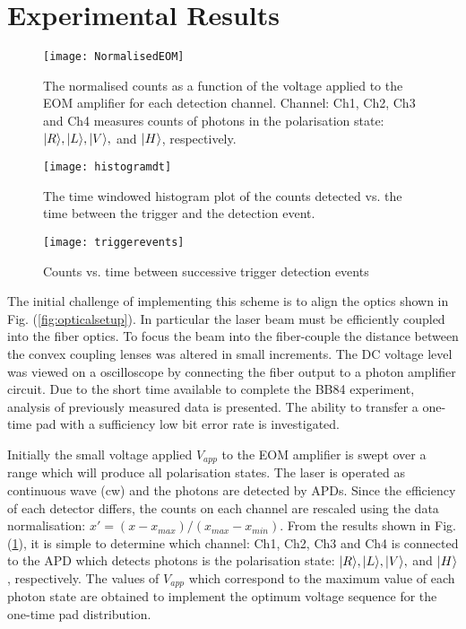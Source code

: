 \section{\label{sec:level1}Experimental Results}
\begin{figure}[b]
\centering
\texttt{[image: NormalisedEOM]}
\caption{\label{fig:NormalisedEOM}The normalised counts as a function of the voltage applied to the EOM amplifier for each detection channel. Channel: Ch1, Ch2, Ch3 and Ch4 measures counts of photons in the polarisation state: $\lvert R\rangle,\lvert L\rangle,\lvert V\rangle,$ and $\lvert H\rangle$, respectively.}
\end{figure}

\begin{figure}[t]
\centering
\texttt{[image: histogramdt]}
\caption{\label{fig:histogramdt}The time windowed histogram plot of the counts detected vs. the time between the trigger and the detection event.}
\end{figure} 

\begin{figure}[b]
\centering
\texttt{[image: triggerevents]}
\caption{\label{fig:triggerevents}Counts vs. time between successive trigger detection events}
\end{figure}

The initial challenge of implementing this scheme is to align the optics shown in Fig. (\ref{fig:opticalsetup}). In particular the laser beam must be efficiently coupled into the fiber optics. To focus the beam into the fiber-couple the distance between the convex coupling lenses was altered in small increments. The DC voltage level was viewed on a oscilloscope by connecting the fiber output to a photon amplifier circuit. Due to the short time available to complete the BB84 experiment, analysis of previously measured data is presented. The ability to transfer a one-time pad with a sufficiency low bit error rate is investigated. 

Initially the small voltage applied $V_{app}$ to the EOM amplifier is swept over a range which will produce all polarisation states. The laser is operated as continuous wave (cw) and the photons are detected by APDs. Since the efficiency of each detector differs, the counts on each channel are rescaled using the data normalisation: $x{}'=(x-x_{max})/(x_{max}-x_{min})$. From the results shown in Fig. (\ref{fig:NormalisedEOM}), it is simple to determine which channel: Ch1, Ch2, Ch3 and Ch4 is connected to the APD which detects photons is the polarisation state: $\lvert R\rangle,\lvert L\rangle,\lvert V\rangle,$ and $\lvert H\rangle$, respectively. The values of $V_{app}$ which correspond to the maximum value of each photon state are obtained to implement the optimum voltage sequence for the one-time pad distribution. 

